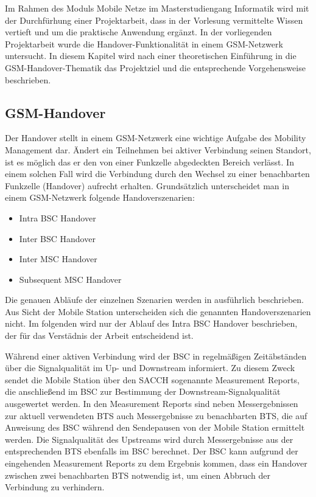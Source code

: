 
Im Rahmen des Moduls Mobile Netze im Masterstudiengang Informatik wird mit der Durchfürhung einer Projektarbeit, dass in der Vorlesung vermittelte Wissen vertieft und um die praktische Anwendung ergänzt. In der vorliegenden Projektarbeit wurde die Handover-Funktionalität in einem GSM-Netzwerk untersucht. In diesem Kapitel wird nach einer theoretischen Einführung in die GSM-Handover-Thematik das Projektziel und die entsprechende Vorgehensweise beschrieben.

\subsection{GSM-Handover}\label{sec:handover}

Der Handover stellt in einem GSM-Netzwerk eine wichtige Aufgabe des Mobility Management dar. Ändert ein Teilnehmen bei aktiver Verbindung seinen Standort, ist es möglich das er den von einer Funkzelle abgedeckten Bereich verlässt. In einem solchen Fall wird die Verbindung durch den Wechsel zu einer benachbarten Funkzelle (Handover) aufrecht erhalten. Grundsätzlich unterscheidet man in einem GSM-Netzwerk folgende Handoverszenarien:

\begin{itemize}
 \item Intra BSC Handover
 \item Inter BSC Handover
 \item Inter MSC Handover
 \item Subsequent MSC Handover
\end{itemize}

Die genauen Abläufe der einzelnen Szenarien werden in \cite{bib:grundkursmks} ausführlich beschrieben. Aus Sicht der Mobile Station unterscheiden sich die genannten Handoverszenarien nicht. Im folgenden wird nur der Ablauf des Intra BSC Handover beschrieben, der für das Verstädnis der Arbeit entscheidend ist.

Während einer aktiven Verbindung wird der BSC in regelmäßigen Zeitäbständen über die Signalqualität im Up- und Downstream informiert. Zu diesem Zweck sendet die Mobile Station über den SACCH sogenannte Measurement Reports, die anschließend im BSC zur Bestimmung der Downstream-Signalqualität ausgewertet werden. In den Measurement Reports sind neben Messergebnissen zur aktuell verwendeten BTS auch Messergebnisse zu benachbarten BTS, die auf Anweisung des BSC während den Sendepausen von der Mobile Station ermittelt werden. Die Signalqualität des Upstreams wird durch Messergebnisse aus der entsprechenden BTS ebenfalls im BSC berechnet. Der BSC kann aufgrund der eingehenden Measurement Reports zu dem Ergebnis kommen, dass ein Handover zwischen zwei benachbarten BTS notwendig ist, um einen Abbruch der Verbindung zu verhindern.

